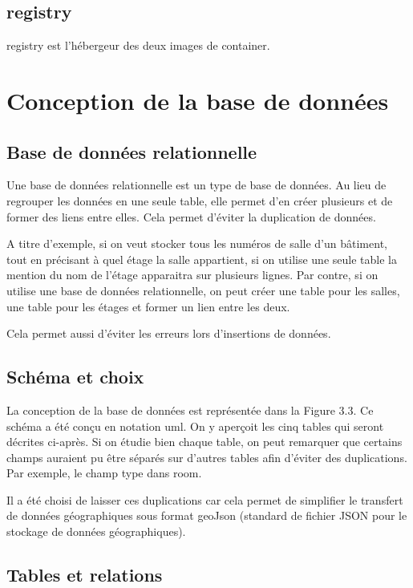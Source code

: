 \documentclass[
    iai, %
    il, %
]{heig-tb}
\begin{document}
\subsection{\gls{registry}}
\gls{registry} est l'hébergeur des deux images de container.


\section{Conception de la base de données}

\subsection{Base de données relationnelle}
Une base de données relationnelle est un type de base de données.
Au lieu de regrouper les données en une seule table,
elle permet d'en créer plusieurs et de former des liens entre elles.
Cela permet d'éviter la duplication de données.

A titre d'exemple, si on veut stocker tous les numéros de salle d'un bâtiment, tout en précisant à quel étage la salle appartient,
si on utilise une seule table la mention du nom de l'étage apparaitra sur plusieurs lignes.
Par contre, si on utilise une base de données relationnelle, on peut créer une table pour les salles,
une table pour les étages et former un lien entre les deux.

Cela permet aussi d'éviter les erreurs lors d'insertions de données.

\subsection{Schéma et choix}


La conception de la base de données est représentée dans la Figure 3.3.
Ce schéma a été conçu en notation \gls{uml}. On y aperçoit les cinq tables qui seront décrites ci-après.
Si on étudie bien chaque table, on peut remarquer que certains champs auraient pu être séparés sur d'autres tables afin d'éviter des duplications.
Par exemple, le champ type dans room.

Il a été choisi de laisser ces duplications
car cela permet de simplifier le transfert de données géographiques sous format geoJson
(standard de fichier JSON pour le stockage de données géographiques).

\subsection{Tables et  relations}
\end{document}

